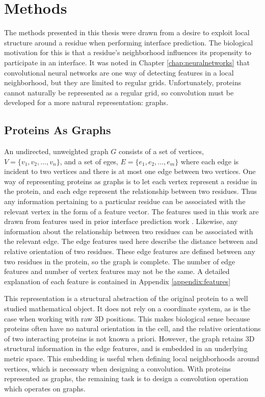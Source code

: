 \chapter{Methods}
\label{chap:methods}

The methods presented in this thesis were drawn from a desire to exploit local structure around a residue when performing interface prediction.
The biological motivation for this is that a residue's neighborhood influences its propensity to participate in an interface.
It was noted in Chapter \ref{chap:neuralnetworks} that convolutional neural networks are one way of detecting features in a local neighborhood, but they are limited to regular grids. 
Unfortunately, proteins cannot naturally be represented as a regular grid, so convolution must be developed for a more natural representation: graphs.


\section{Proteins As Graphs}

An undirected, unweighted graph $G$ consists of a set of vertices, $V=\{v_1, v_2, ..., v_n\}$, and a set of eges, $E=\{e_1, e_2, ..., e_m\}$ where each edge is incident to two vertices and there is at most one edge between two vertices.
One way of representing proteins as graphs is to let each vertex represent a residue in the protein, and each edge represent the relationship between two residues.
Thus any information pertaining to a particular residue can be associated with the relevant vertex in the form of a feature vector.
The features used in this work are drawn from features used in prior interface prediction work \cite{minhas2014}.
Likewise, any information about the relationship between two residues can be associated with the relevant edge.
The edge features used here describe the distance between and relative orientation of two residues.
These edge features are defined between any two residues in the protein, so the graph is complete. 
The number of edge features and number of vertex features may not be the same.
A detailed explanation of each feature is contained in Appendix \ref{appendix:features}

This representation is a structural abstraction of the original protein to a well studied mathematical object.
It does not rely on a coordinate system, as is the case when working with raw 3D positions.
This makes biological sense because proteins often have no natural orientation in the cell, and the relative orientations of two interacting proteins is not known a priori.
However, the graph retains 3D structural information in the edge features, and is embedded in an underlying metric space.
This embedding is useful when defining local neighborhoods around vertices, which is necessary when designing a convolution.
With proteins represented as graphs, the remaining task is to design a convolution operation which operates on graphs. 

